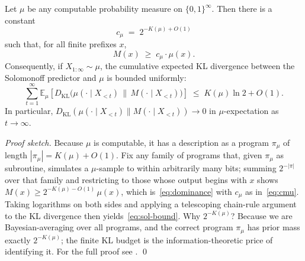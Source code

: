 \begin{theorem}
\label{thm:solomonoff}
Let $\mu$ be any computable probability measure on $\{0,1\}^\infty$.
Then there is a constant
\begin{equation}
  c_\mu \;=\; 2^{-K(\mu) + O(1)} \label{eq:cmu}
\end{equation}
such that, for all finite prefixes $x$,
\begin{equation}
  M(x) \;\ge\; c_\mu \cdot \mu(x). \label{eq:dominance}
\end{equation}
Consequently, if $X_{1:\infty} \sim \mu$, the cumulative expected
KL divergence between the Solomonoff predictor and $\mu$ is bounded
uniformly:
\begin{equation}
  \sum_{t=1}^{\infty}
    \mathbb{E}_{\mu}\!\left[
      D_{\mathrm{KL}}\!\bigl(\mu(\cdot \mid X_{<t}) \,\|\, M(\cdot \mid X_{<t})\bigr)
    \right]
  \;\le\; K(\mu)\ln 2 + O(1). \label{eq:sol-bound}
\end{equation}
In particular,
$D_{\mathrm{KL}}(\mu(\cdot \mid X_{<t}) \| M(\cdot \mid X_{<t})) \to 0$
in $\mu$-expectation as $t \to \infty$.
\end{theorem}

\emph{Proof sketch.} Because $\mu$ is computable, it has a description
as a program $\pi_\mu$ of length $|\pi_\mu| = K(\mu) + O(1)$. Fix any
family of programs that, given $\pi_\mu$ as subroutine, simulates a
$\mu$-sample to within arbitrarily many bits; summing $2^{-|\pi|}$ over
that family and restricting to those whose output begins with $x$
shows $M(x) \ge 2^{-K(\mu) - O(1)}\,\mu(x)$, which is~\eqref{eq:dominance}
with $c_\mu$ as in~\eqref{eq:cmu}. Taking logarithms on both sides and
applying a telescoping chain-rule argument to the KL divergence
then yields~\eqref{eq:sol-bound}. Why $2^{-K(\mu)}$? Because we are
Bayesian-averaging over all programs, and the correct program
$\pi_\mu$ has prior mass exactly $2^{-K(\mu)}$; the finite KL budget is
the information-theoretic price of identifying it. For the full proof
see \citet[Ch.\ 5]{livitanyi2019}. \qed

